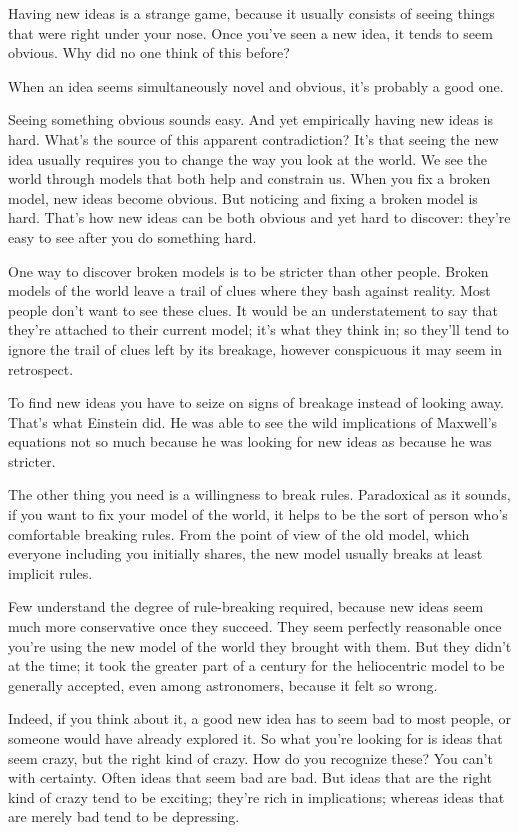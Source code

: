 Having new ideas is a strange game, because it usually consists of
seeing things that were right under your nose. Once you've seen a new
idea, it tends to seem obvious. Why did no one think of this before?

When an idea seems simultaneously novel and obvious, it's probably a
good one.

Seeing something obvious sounds easy. And yet empirically having new
ideas is hard. What's the source of this apparent contradiction? It's
that seeing the new idea usually requires you to change the way you look
at the world. We see the world through models that both help and
constrain us. When you fix a broken model, new ideas become obvious. But
noticing and fixing a broken model is hard. That's how new ideas can be
both obvious and yet hard to discover: they're easy to see after you do
something hard.

One way to discover broken models is to be stricter than other people.
Broken models of the world leave a trail of clues where they bash
against reality. Most people don't want to see these clues. It would be
an understatement to say that they're attached to their current model;
it's what they think in; so they'll tend to ignore the trail of clues
left by its breakage, however conspicuous it may seem in retrospect.

To find new ideas you have to seize on signs of breakage instead of
looking away. That's what Einstein did. He was able to see the wild
implications of Maxwell's equations not so much because he was looking
for new ideas as because he was stricter.

The other thing you need is a willingness to break rules. Paradoxical as
it sounds, if you want to fix your model of the world, it helps to be
the sort of person who's comfortable breaking rules. From the point of
view of the old model, which everyone including you initially shares,
the new model usually breaks at least implicit rules.

Few understand the degree of rule-breaking required, because new ideas
seem much more conservative once they succeed. They seem perfectly
reasonable once you're using the new model of the world they brought
with them. But they didn't at the time; it took the greater part of a
century for the heliocentric model to be generally accepted, even among
astronomers, because it felt so wrong.

Indeed, if you think about it, a good new idea has to seem bad to most
people, or someone would have already explored it. So what you're
looking for is ideas that seem crazy, but the right kind of crazy. How
do you recognize these? You can't with certainty. Often ideas that seem
bad are bad. But ideas that are the right kind of crazy tend to be
exciting; they're rich in implications; whereas ideas that are merely
bad tend to be depressing.


